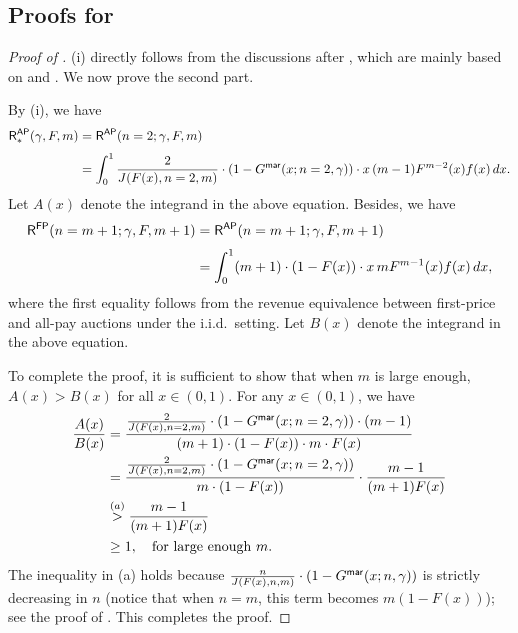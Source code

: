 \subsection{Proofs for }
\begin{proof}[Proof of ]

 (i) directly follows from the discussions after , which are mainly based on  and . We now prove the second part.

By  (i), we have
\begin{align*}
 \mathsf{R}_\ast^{\mathsf{AP}}(\gamma,F,m)
 &= \mathsf{R}^{\mathsf{AP}}(n=2;\gamma,F,m)\\[1mm]
 &= \int_0^1 \frac{2}{J(F(x),n=2,m)} \cdot \left(1-G^{\mathsf{mar}}(x; n=2,\gamma)\right) \cdot x \, (m-1) F^{m-2}(x) f(x) \, dx.
\end{align*}
Let $A(x)$ denote the integrand in the above equation.
Besides, we have
\begin{align*}
 \mathsf{R}^{\mathsf{FP}}(n=m+1;\gamma,F,m+1)
 &= \mathsf{R}^{\mathsf{AP}}(n=m+1;\gamma,F,m+1)\\[1mm]
 &= \int_0^1 (m+1) \cdot (1-F(x)) \cdot x \, m F^{m-1}(x) f(x) \, dx,
\end{align*}
where the first equality follows from the revenue equivalence between first-price and all-pay auctions under the i.i.d.\ setting. Let $B(x)$ denote the integrand in the above equation.

To complete the proof, it is sufficient to show that when $m$ is large enough, $A(x) > B(x)$ for all $x \in (0,1)$. For any $x \in (0,1)$, we have
\begin{align*}
  \frac{A(x)}{B(x)}
  &= \frac{\frac{2}{J(F(x),n=2,m)} \cdot \left(1-G^{\mathsf{mar}}(x; n=2,\gamma)\right) \cdot (m-1)}{(m+1) \cdot (1-F(x)) \cdot m \cdot F(x)} \\
  &= \frac{\frac{2}{J(F(x),n=2,m)} \cdot \left(1-G^{\mathsf{mar}}(x; n=2,\gamma)\right)}{m \cdot (1-F(x))} \cdot \frac{m-1}{(m+1)F(x)} \\
  &\overset{(a)}{>} \frac{m-1}{(m+1)F(x)} \\
  &\geq 1, \quad \text{for large enough } m.
\end{align*}
The inequality in (a) holds because $\frac{n}{J(F(x),n,m)} \cdot (1-G^{\mathsf{mar}}(x;n,\gamma))$ is strictly decreasing in $n$ (notice that when $n=m$, this term becomes $m(1-F(x))$); see the proof of . This completes the proof.
\end{proof}







